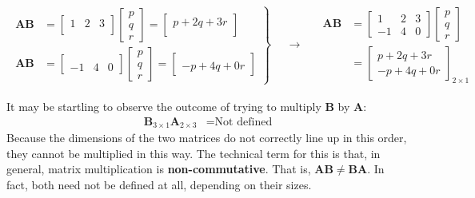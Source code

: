 \documentclass[11pt]{article}
\newcommand{\keyphrase}{\textbf}
\newcommand{\mat}[1]{\mathbf{#1}}
\begin{document}
\begin{align*}
\left.
\begin{aligned}
\mat{A} \mat{B} &= \begin{bmatrix}1 & 2 & 3 \\ \,\end{bmatrix} \begin{bmatrix}p\\q\\r\end{bmatrix}
= \begin{bmatrix}p+2q+3r \\ \,\end{bmatrix}
\\
\mat{A} \mat{B} &= \begin{bmatrix} \\-1 & 4 & 0\end{bmatrix} \begin{bmatrix}p\\q\\r\end{bmatrix}
= \begin{bmatrix}\\-p+4q+0r\end{bmatrix}
\end{aligned}\right\}
&&
\longrightarrow
&&
\begin{aligned}
\mat{A} \mat{B} &= \begin{bmatrix}1 & 2 & 3 \\ -1 & 4 & 0\end{bmatrix}\begin{bmatrix}p\\q\\r\end{bmatrix}
\\
&=
\begin{bmatrix}
p + 2q + 3r \\
-p + 4q + 0r
\end{bmatrix}_{2 \times 1}
\end{aligned}
\end{align*}

It may be startling to observe the outcome of trying to multiply $\mat{B}$ by $\mat{A}$:
\begin{align*}
\mat{B}_{3 \times 1} \mat{A}_{2 \times 3} &= \text{Not defined}
\end{align*}
Because the dimensions of the two matrices do not correctly line up in this order, they cannot be multiplied in this way. The technical term for this is that, in general, matrix multiplication is \keyphrase{non-commutative}. That is, $\mat{A} \mat{B} \neq \mat{B} \mat{A}$. In fact, both need not be defined at all, depending on their sizes.
\end{document}
